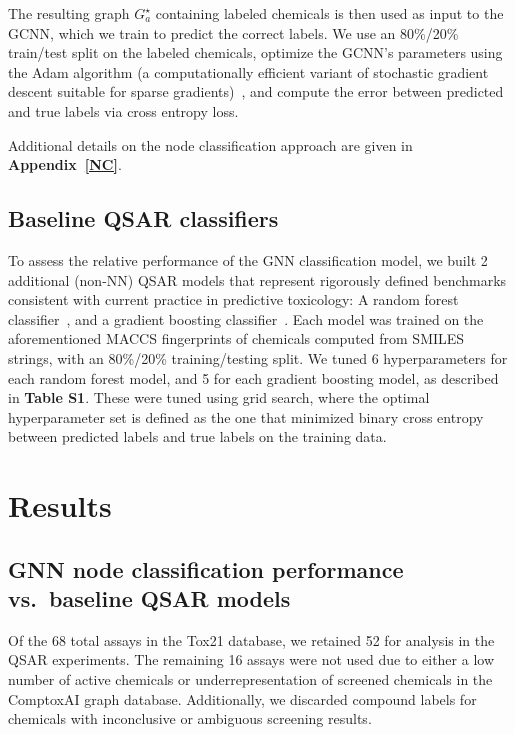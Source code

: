 \documentclass{ws-procs11x85}
\begin{document}
The resulting graph $G_a^\star$ containing labeled chemicals is then used as input to the GCNN, which we train to predict the correct labels.
We use an 80\%/20\% train/test split on the labeled chemicals, optimize the GCNN's parameters using the Adam algorithm (a computationally efficient variant of stochastic gradient descent suitable for sparse gradients)~\cite{kingma2014adam}, and compute the error between predicted and true labels via cross entropy loss.

Additional details on the node classification approach are given in \textbf{Appendix~\ref{NC}}.

\subsection{Baseline QSAR classifiers}
To assess the relative performance of the GNN classification model, we built 2 additional (non-NN) QSAR models that represent rigorously defined benchmarks consistent with current practice in predictive toxicology: A random forest classifier~\cite{svetnik2003random}, and a gradient boosting classifier~\cite{sheridan2016extreme}.
Each model was trained on the aforementioned MACCS fingerprints of chemicals computed from SMILES strings, with an 80\%/20\% training/testing split.
We tuned 6 hyperparameters for each random forest model, and 5 for each gradient boosting model, as described in \textbf{Table S1}.
These were tuned using grid search, where the optimal hyperparameter set is defined as the one that minimized binary cross entropy between predicted labels and true labels on the training data.

\section{Results}
\subsection{GNN node classification performance vs.\ baseline QSAR models}
Of the 68 total assays in the Tox21 database, we retained 52 for analysis in the QSAR experiments.
The remaining 16 assays were not used due to either a low number of active chemicals or underrepresentation of screened chemicals in the ComptoxAI graph database.
Additionally, we discarded compound labels for chemicals with inconclusive or ambiguous screening results.
\end{document}
